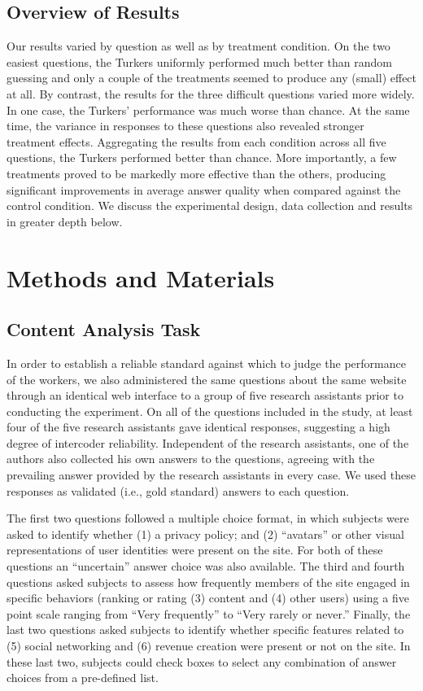 \documentclass{cscw2010}
\begin{document}
\subsection{Overview of Results} 
Our results varied by question as well as by
treatment condition. On the two easiest questions, the Turkers
uniformly performed much better than random guessing and only a couple
of the treatments seemed to produce any (small) effect at all. By
contrast, the results for the three difficult questions varied more
widely. In one case, the Turkers' performance was much worse than
chance. At the same time, the variance in responses to these questions
also revealed stronger treatment effects. Aggregating the results from
each condition across all five questions, the Turkers performed better
than chance. More importantly, a few treatments proved to be markedly more effective
than the others, producing significant improvements in
average answer quality when compared against the control condition. We
discuss the experimental design, data collection and results in
greater depth below.

\section{Methods and Materials}

\subsection{Content Analysis Task}

In order to establish a reliable standard against which to judge the
performance of the workers, we also administered the same questions
about the same website through an identical web interface to a group
of five research assistants prior to conducting the experiment. On all
of the questions included in the study, at least four of the five
research assistants gave identical responses, suggesting a high degree
of intercoder reliability. Independent of the research assistants,
one of the authors also collected his own answers to the questions, agreeing
with the prevailing answer provided by the research assistants in
every case. We used these responses as validated (i.e., gold standard)
answers to each question.

The first two questions followed a multiple choice format, in which
subjects were asked to identify whether (1) a privacy policy; and (2)
``avatars'' or other visual representations of user identities were
present on the site. For both of these questions an ``uncertain''
answer choice was also available. The third and fourth questions asked
subjects to assess how frequently members of the site engaged in
specific behaviors (ranking or rating (3) content and (4) other users)
using a five point scale ranging from ``Very frequently'' to ``Very
rarely or never.''  Finally, the last two questions asked subjects to
identify whether specific features related to (5) social networking
and (6) revenue creation were present or not on the site. In these
last two, subjects could check boxes to select any combination of
answer choices from a pre-defined list.
\end{document}
